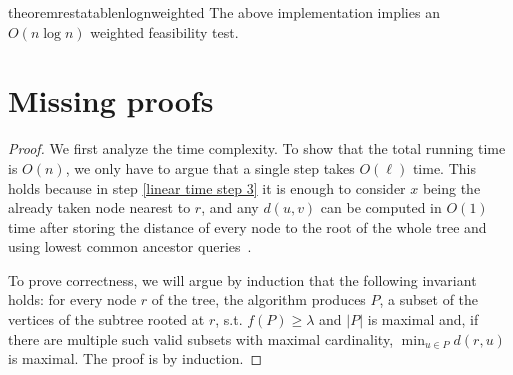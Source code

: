 \documentclass[a4paper,UKenglish]{lipics-v2016}
\theoremstyle{plain}
\begin{document}
\begin{restatable}{theoremrestatable}{nlognweighted}
\label{nlogn weighted f.t. theorem}
The above implementation implies an $O(n \log n)$ weighted feasibility test.
\end{restatable}



\newpage
\appendix

\section{Missing proofs}\label{appendix missing proofs}

\lineartimecorrectness*
\begin{proof}
We first analyze the time complexity. To show that the total running time is $O(n)$, we only have to argue that a single step
takes $O(\ell)$ time. This holds because in step \ref{linear time step 3} it is enough to consider $x$ being the already taken
node nearest to $r$, and any $d(u,v)$ can be computed in $O(1)$ time after storing the distance of every node to the root of the
whole tree and using lowest common ancestor queries~\cite{Bender2000}.

To prove correctness, we will argue by induction that the following invariant holds: for every node $r$ of the tree, the algorithm
produces $P$, a subset of the vertices of the subtree rooted at $r$, s.t. $f(P)\geq\lambda$ and $|P|$ is maximal and, if there are multiple
such valid subsets with maximal cardinality, $\min_{u\in P} d(r,u)$ is maximal. The proof is by induction.


\end{proof}
\end{document}
